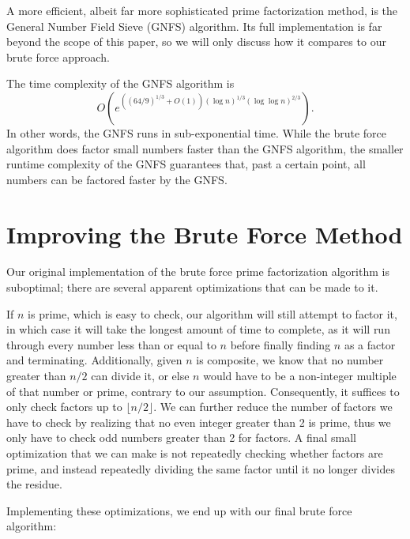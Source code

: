\documentclass[letterpaper,twocolumn,12pt]{article}
\newcommand{\parens}[1]{\left( #1 \right)}
\begin{document}
    A more efficient, albeit far more sophisticated prime factorization
    method, is the General Number Field Sieve (GNFS) algorithm.
    Its full implementation is far beyond the scope of this paper, so we will
    only discuss how it compares to our brute force approach.

    The time complexity of the GNFS algorithm is
    \[
        O\parens{e^{
            \parens{(64 / 9)^{1 / 3} + O(1)}
            \parens{\log n}^{1 / 3}(\log\log n)^{2 / 3}
        }}.
    \]
    In other words, the GNFS runs in sub-exponential time.
    While the brute force algorithm does factor small numbers faster than the
    GNFS algorithm, the smaller runtime complexity of the GNFS guarantees that,
    past a certain point, all numbers can be factored faster by the GNFS.

    \section*{Improving the Brute Force Method}

    Our original implementation of the brute force prime factorization
    algorithm is suboptimal; there are several apparent optimizations that can
    be made to it.

    If \( n \) is prime, which is easy to check, our algorithm will still
    attempt to factor it, in which case it will take the longest amount of
    time to complete, as it will run through every number less than or equal to
    \( n \) before finally finding \( n \) as a factor and terminating.
    Additionally, given \( n \) is composite, we know that no number greater
    than \( n / 2 \) can divide it, or else \( n \) would have to be a
    non-integer multiple of that number or prime, contrary to our assumption.
    Consequently, it suffices to only check factors up to
    \( \lfloor n / 2 \rfloor \).
    We can further reduce the number of factors we have to check by realizing
    that no even integer greater than 2 is prime, thus we only have to check
    odd numbers greater than 2 for factors.
    A final small optimization that we can make is not repeatedly checking
    whether factors are prime, and instead repeatedly dividing the same factor
    until it no longer divides the residue.

    Implementing these optimizations, we end up with our final brute force
    algorithm:
\end{document}

